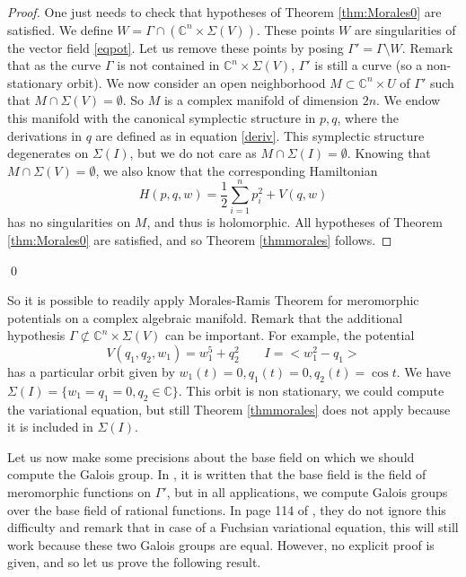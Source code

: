 \documentclass[smallcondensed]{svjour3}
\begin{document}
\begin{proof}
One just needs to check that hypotheses of Theorem \ref{thm:Morales0} are satisfied. We define $W=\Gamma\cap (\mathbb{C}^n\times\Sigma(V))$. These points $W$ are singularities of the vector field \eqref{eqpot}. Let us remove these points by posing $\Gamma'=\Gamma\setminus W$. Remark that as the curve $\Gamma$ is not contained in $\mathbb{C}^n\times\Sigma(V)$, $\Gamma'$ is still a curve (so a non-stationary orbit). We now consider an open neighborhood $M\subset \mathbb{C}^n\times U$ of $\Gamma'$ such that $M\cap \Sigma(V)=\emptyset$. So $M$ is a complex manifold of dimension $2n$. We endow this manifold with the canonical symplectic structure in $p,q$, where the derivations in $q$ are defined as in equation \eqref{deriv}. This symplectic structure degenerates on $\Sigma(I)$, but we do not care as $M\cap \Sigma(I)=\emptyset$. Knowing that $M\cap \Sigma(V)=\emptyset$, we also know that the corresponding Hamiltonian
$$H(p,q,w)=\frac{1}{2} \sum\limits_{i=1}^n p_i^2 +V(q,w)$$
has no singularities on $M$, and thus is holomorphic. All hypotheses of Theorem \ref{thm:Morales0} are satisfied, and so Theorem \ref{thmmorales} follows.
\end{proof}\qed


So it is possible to readily apply Morales-Ramis Theorem for meromorphic potentials on a complex algebraic manifold. Remark that the additional hypothesis $\Gamma \not\subset \mathbb{C}^n\times\Sigma(V)$ can be important. For example, the potential
\begin{equation}\label{prob}
V(q_1,q_2,w_1)=w_1^5+q_2^2 \qquad I=<w_1^2-q_1>
\end{equation}
has a particular orbit given by $w_1(t)=0,q_1(t)=0,q_2(t)=\cos t$. We have $\Sigma(I)=\{w_1=q_1=0,q_2\in\mathbb{C}\}$. This orbit is non stationary, we could compute the variational equation, but still Theorem \ref{thmmorales} does not apply because it is included in $\Sigma(I)$.

\medskip

Let us now make some precisions about the base field on which we should compute the Galois group. In \cite{5}, it is written that the base field is the field of meromorphic functions on $\Gamma'$, but in all applications, we compute Galois groups over the base field of rational functions. In page 114 of \cite{5}, they do not ignore this difficulty and remark that in case of a Fuchsian variational equation, this will still work because these two Galois groups are equal. However, no explicit proof is given, and so let us prove the following result.
\end{document}
